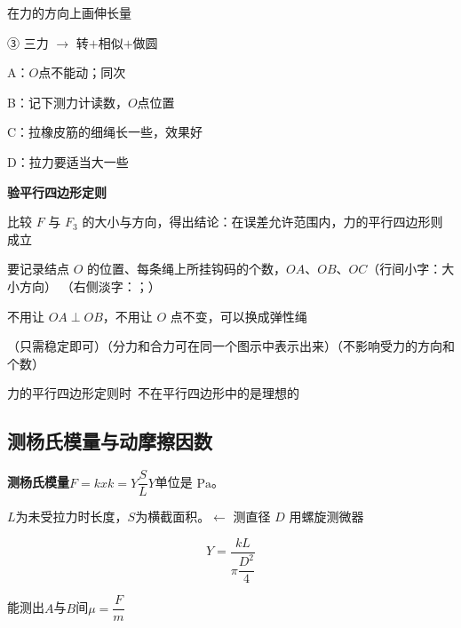 
在力的方向上画伸长量



③ 三力 $\to$ 转$+$相似$+$做圆


A：$O$点不能动；同次\ \red{$\checkmark$}

B：记下测力计读数，$O$点位置 %

C：拉橡皮筋的细绳长一些，效果好\ \red{$\checkmark$}\quad {}

D：拉力要适当大一些\ \red{$\checkmark$}

\textbf{验平行四边形定则} %


比较 $F$ 与 $F_3$ 的大小与方向，得出结论：在误差允许范围内，力的平行四边形则成立


要记录结点 $O$ 的位置、每条绳上所挂钩码的个数，$OA$、$OB$、$OC$（行间小字：大小方向）
（右侧淡字：；）

不用让 $OA\perp OB$，不用让 $O$ 点不变，可以换成弹性绳

（只需稳定即可）\quad（分力和合力可在同一个图示中表示出来）\quad（不影响受力的方向和个数）

力的平行四边形定则时\ 不在平行四边形中的是理想的

\subsection{测杨氏模量与动摩擦因数}
\textbf{测杨氏模量}\quad $F=kx$\quad $k=Y\dfrac{S}{L}$\quad $Y$单位是 $\mathrm{Pa}$。

$L$为未受拉力时长度，$S$为横截面积。$\leftarrow$ 测直径 $D$ 用螺旋测微器 %

\[ Y=\frac{kL}{\pi\dfrac{D^2}{4}} \]



能测出$A$与$B$间$\mu=\dfrac{F}{m}$ %

